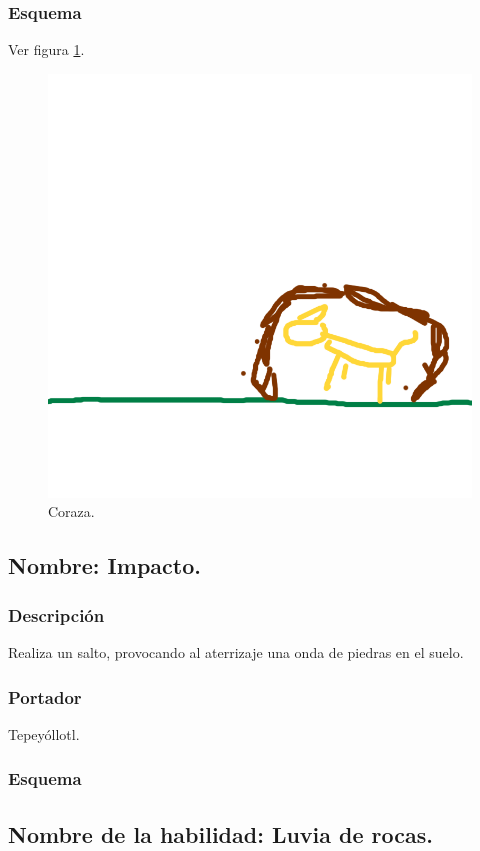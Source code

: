 \documentclass[11pt,letterpaper]{article}
\begin{document}
\subsubsection{Esquema}
			Ver figura \ref{fig:coraza}.
			\begin{figure}
				\centering
				\includegraphics[height=0.2 \textheight]{Imagenes/coraza}
				\caption{Coraza.}
				\label{fig:coraza}
			\end{figure}
\subsection{Nombre: Impacto.}
\subsubsection{Descripción}
Realiza un salto, provocando al aterrizaje una onda de piedras en el suelo.
\subsubsection{Portador}
Tepeyóllotl.
\subsubsection{Esquema}
\subsection{Nombre de la habilidad: Luvia de rocas.}
\end{document}
